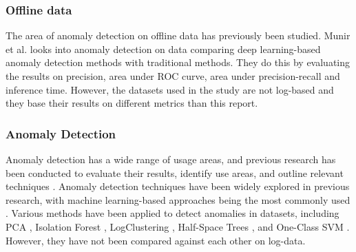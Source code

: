 \subsubsection{Offline data}
The area of anomaly detection on offline data has previously been studied. Munir et al. \cite{Munir2019Comparativeanalysis} looks into anomaly detection on data comparing deep learning-based anomaly detection methods with traditional methods. They do this by evaluating the results on precision, area under ROC curve, area under precision-recall and inference time. However, the datasets used in the study are not log-based and they base their results on different metrics than this report. 

\subsubsection{Anomaly Detection}
Anomaly detection has a wide range of usage areas, and previous research has been conducted to evaluate their results, identify use areas, and outline relevant techniques \cite{Callegari2017anoverviewofselectedmethods}\cite{Varun2009Anomaly}. Anomaly detection techniques have been widely explored in previous research, with machine learning-based approaches being the most commonly used \cite{Shilin2017experiencereport} \cite{Wei2010consolelogs} \cite{ZEUFACK2021100030Anunsupervisedanomalydetection}. Various methods have been applied to detect anomalies in datasets, including PCA \cite{Shilin2017experiencereport}\cite{Munir2019Comparativeanalysis}\cite{Mahadevan2009Fault},
Isolation Forest \cite{Munir2019Comparativeanalysis}\cite{Awad2023anomalydetectionandsecurityenhancement}\cite{Lukito2023Comparison},
LogClustering \cite{7883294}, Half-Space Trees \cite{SweeChuan2011FastAnomalyDetectionForStreamingData}, and One-Class SVM \cite{Lukito2023Comparison}\cite{Mahadevan2009Fault}. However, they have not been compared against each other on log-data. 